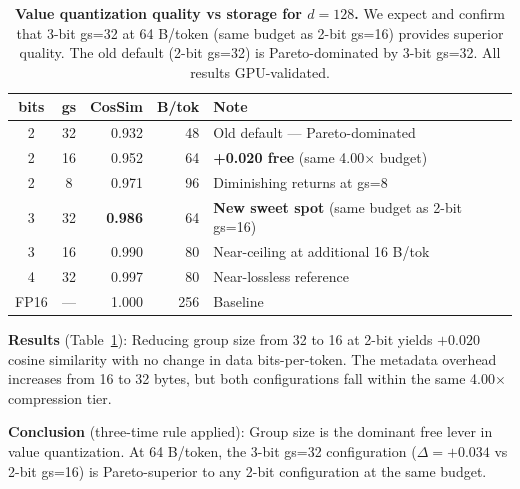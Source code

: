 \documentclass{article}
\begin{document}
\begin{table}[t]
\centering
\caption{\textbf{Value quantization quality vs storage for $d=128$.} We expect and confirm that 3-bit gs=32 at 64 B/token (same budget as 2-bit gs=16) provides superior quality. The old default (2-bit gs=32) is Pareto-dominated by 3-bit gs=32. All results GPU-validated.}
\label{tab:main}
\begin{tabular}{ccrrl}
\toprule
\textbf{bits} & \textbf{gs} & \textbf{CosSim} & \textbf{B/tok} & \textbf{Note} \\
\midrule
2 & 32 & 0.932 & 48 & Old default — Pareto-dominated \\
2 & 16 & 0.952 & 64 & \textbf{+0.020 free} (same 4.00$\times$ budget) \\
2 & 8  & 0.971 & 96 & Diminishing returns at gs=8 \\
\midrule
3 & 32 & \textbf{0.986} & 64 & \textbf{New sweet spot} (same budget as 2-bit gs=16) \\
3 & 16 & 0.990 & 80 & Near-ceiling at additional 16 B/tok \\
\midrule
4 & 32 & 0.997 & 80 & Near-lossless reference \\
FP16 & — & 1.000 & 256 & Baseline \\
\bottomrule
\end{tabular}
\end{table}

\textbf{Results} (Table~\ref{tab:main}): Reducing group size from 32 to 16 at 2-bit yields $+0.020$ cosine similarity with no change in data bits-per-token. The metadata overhead increases from 16 to 32 bytes, but both configurations fall within the same 4.00$\times$ compression tier.

\textbf{Conclusion} (three-time rule applied): Group size is the dominant free lever in value quantization. At 64 B/token, the 3-bit gs=32 configuration ($\Delta = +0.034$ vs 2-bit gs=16) is Pareto-superior to any 2-bit configuration at the same budget.
\end{document}
